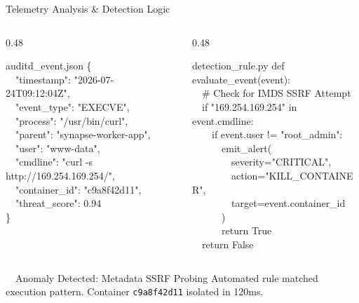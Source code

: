 \documentclass[aspectratio=169, 10pt]{beamer}
\begin{document}
\begin{frame}{Telemetry Analysis \& Detection Logic}
  \begin{columns}[T]
    \begin{column}{0.48\textwidth}
      \begin{terminalbox}{auditd\_event.json}
        {\ttfamily\tiny\color{textlight}
\{ \\
\ \ "timestamp": "2026-07-24T09:12:04Z", \\
\ \ "event\_type": "EXECVE", \\
\ \ "process": "/usr/bin/curl", \\
\ \ "parent": "synapse-worker-app", \\
\ \ "user": "www-data", \\
\ \ "cmdline": "curl -s http://169.254.169.254/", \\
\ \ "container\_id": "c9a8f42d11", \\
\ \ "threat\_score": 0.94 \\
\}
        }
      \end{terminalbox}
    \end{column}

    \begin{column}{0.48\textwidth}
      \begin{terminalbox}{detection\_rule.py}
        {\ttfamily\tiny\color{cybercyan}
def evaluate\_event(event): \\
\ \ \# Check for IMDS SSRF Attempt \\
\ \ if "169.254.169.254" in event.cmdline: \\
\ \ \ \ if event.user != "root\_admin": \\
\ \ \ \ \ \ emit\_alert( \\
\ \ \ \ \ \ \ \ severity="CRITICAL", \\
\ \ \ \ \ \ \ \ action="KILL\_CONTAINER", \\
\ \ \ \ \ \ \ \ target=event.container\_id \\
\ \ \ \ \ \ ) \\
\ \ \ \ \ \ return True \\
\ \ return False
        }
      \end{terminalbox}
    \end{column}
  \end{columns}

  \vspace{3pt}
  \begin{alertcard}{\faBug\ \ Anomaly Detected: Metadata SSRF Probing}
    {\small Automated rule matched execution pattern. Container \texttt{c9a8f42d11} isolated in 120ms.}
  \end{alertcard}
\end{frame}
\end{document}
